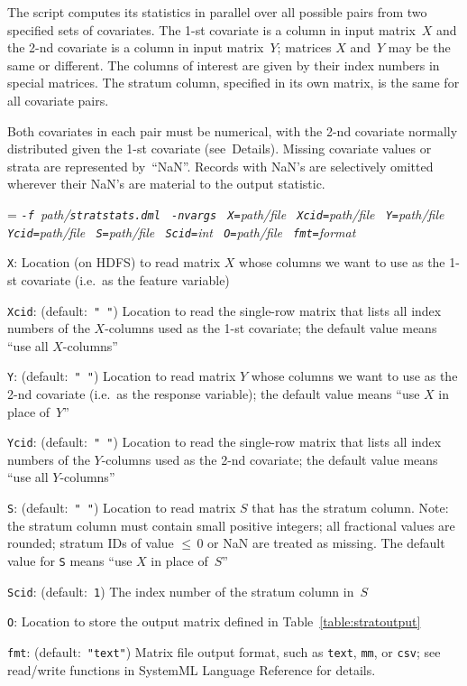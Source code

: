 The script computes its statistics in parallel over all possible pairs from two
specified sets of covariates.  The 1-st covariate is a column in input matrix~$X$
and the 2-nd covariate is a column in input matrix~$Y$; matrices $X$ and~$Y$ may
be the same or different.  The columns of interest are given by their index numbers
in special matrices.  The stratum column, specified in its own matrix, is the same
for all covariate pairs.

Both covariates in each pair must be numerical, with the 2-nd covariate normally
distributed given the 1-st covariate (see~Details).  Missing covariate values or
strata are represented by~``NaN''.  Records with NaN's are selectively omitted
wherever their NaN's are material to the output statistic.

\smallskip
\pagebreak[3]

\smallskip

{\hangindent=\parindent\noindent\it%
{\tt{}-f }path/\/{\tt{}stratstats.dml}
{\tt{} -nvargs}
{\tt{} X=}path/file
{\tt{} Xcid=}path/file
{\tt{} Y=}path/file
{\tt{} Ycid=}path/file
{\tt{} S=}path/file
{\tt{} Scid=}int
{\tt{} O=}path/file
{\tt{} fmt=}format

}


\smallskip
{}
\begin{Description}
\item[{\tt X}:]
Location (on HDFS) to read matrix $X$ whose columns we want to use as
the 1-st covariate (i.e.~as the feature variable)
\item[{\tt Xcid}:] (default:\mbox{ }{\tt " "})
Location to read the single-row matrix that lists all index numbers
of the $X$-columns used as the 1-st covariate; the default value means
``use all $X$-columns''
\item[{\tt Y}:] (default:\mbox{ }{\tt " "})
Location to read matrix $Y$ whose columns we want to use as the 2-nd
covariate (i.e.~as the response variable); the default value means
``use $X$ in place of~$Y$''
\item[{\tt Ycid}:] (default:\mbox{ }{\tt " "})
Location to read the single-row matrix that lists all index numbers
of the $Y$-columns used as the 2-nd covariate; the default value means
``use all $Y$-columns''
\item[{\tt S}:] (default:\mbox{ }{\tt " "})
Location to read matrix $S$ that has the stratum column.
Note: the stratum column must contain small positive integers; all fractional
values are rounded; stratum IDs of value ${\leq}\,0$ or NaN are treated as
missing.  The default value for {\tt S} means ``use $X$ in place of~$S$''
\item[{\tt Scid}:] (default:\mbox{ }{\tt 1})
The index number of the stratum column in~$S$
\item[{\tt O}:]
Location to store the output matrix defined in Table~\ref{table:stratoutput}
\item[{\tt fmt}:] (default:\mbox{ }{\tt "text"})
Matrix file output format, such as {\tt text}, {\tt mm}, or {\tt csv};
see read/write functions in SystemML Language Reference for details.
\end{Description}


